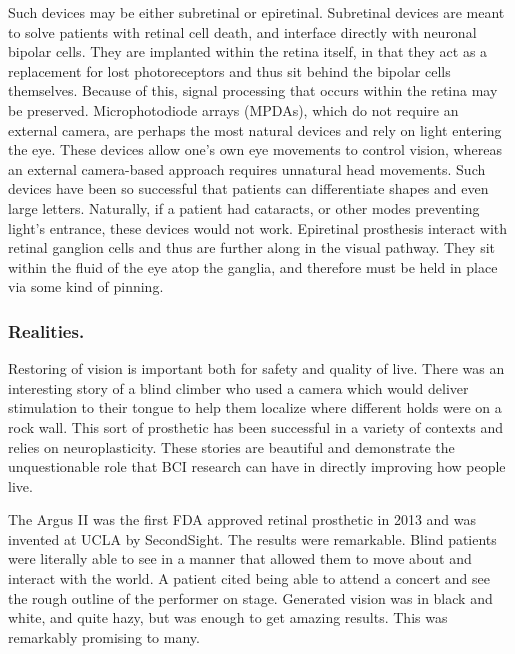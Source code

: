 Such devices may be either subretinal or epiretinal. Subretinal devices are meant to solve patients with retinal cell death, and interface directly with neuronal bipolar cells. They are implanted within the retina itself, in that they act as a replacement for lost photoreceptors and thus sit behind the bipolar cells themselves. Because of this, signal processing that occurs within the retina may be preserved. Microphotodiode arrays (MPDAs), which do not require an external camera, are perhaps the most natural devices and rely on light entering the eye. These devices allow one's own eye movements to control vision, whereas an external camera-based approach requires unnatural head movements. Such devices have been so successful that patients can differentiate shapes and even large letters. Naturally, if a patient had cataracts, or other modes preventing light's entrance, these devices would not work. Epiretinal prosthesis interact with retinal ganglion cells and thus are further along in the visual pathway. They sit within the fluid of the eye atop the ganglia, and therefore must be held in place via some kind of pinning. 

\subsubsection{Realities.}

Restoring of vision is important both for safety and quality of live. There was an interesting story of a blind climber who used a camera which would deliver stimulation to their tongue to help them localize where different holds were on a rock wall. This sort of prosthetic has been successful in a variety of contexts and relies on neuroplasticity. These stories are beautiful and demonstrate the unquestionable role that BCI research can have in directly improving how people live.\newline

The Argus II was the first FDA approved retinal prosthetic in 2013 and was invented at UCLA by SecondSight. The results were remarkable. Blind patients were literally able to see in a manner that allowed them to move about and interact with the world. A patient cited being able to attend a concert and see the rough outline of the performer on stage. Generated vision was in black and white, and quite hazy, but was enough to get amazing results. This was remarkably promising to many.\newline

